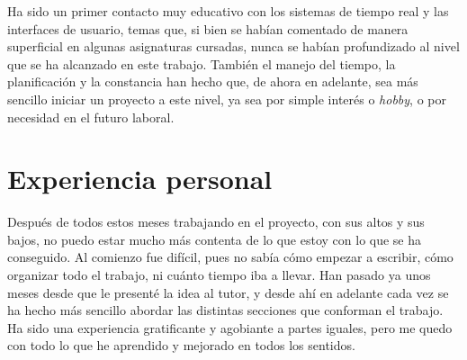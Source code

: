 Ha sido un primer contacto muy educativo con los sistemas de tiempo real y las interfaces de usuario, temas que, si bien se habían comentado de manera superficial en algunas asignaturas cursadas, nunca se habían profundizado al nivel que se ha alcanzado en este trabajo. También el manejo del tiempo, la planificación y la constancia han hecho que, de ahora en adelante, sea más sencillo iniciar un proyecto a este nivel, ya sea por simple interés o \textit{hobby}, o por necesidad en el futuro laboral. 

\section{Experiencia personal}

Después de todos estos meses trabajando en el proyecto, con sus altos y sus bajos, no puedo estar mucho más contenta de lo que estoy con lo que se ha conseguido. Al comienzo fue difícil, pues no sabía cómo empezar a escribir, cómo organizar todo el trabajo, ni cuánto tiempo iba a llevar. Han pasado ya unos meses desde que le presenté la idea al tutor, y desde ahí en adelante cada vez se ha hecho más sencillo abordar las distintas secciones que conforman el trabajo. Ha sido una experiencia gratificante y agobiante a partes iguales, pero me quedo con todo lo que he aprendido y mejorado en todos los sentidos. 